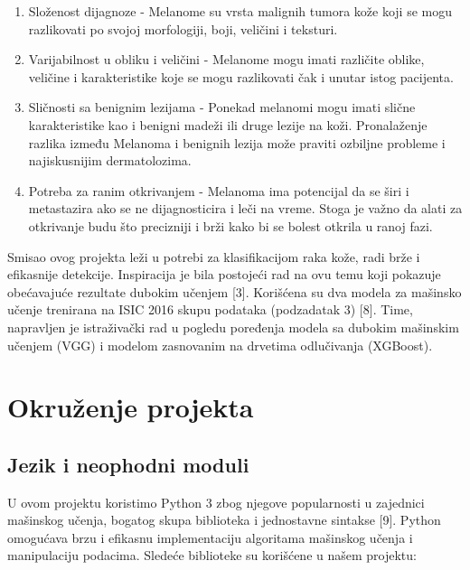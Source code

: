 \documentclass{article}
\begin{document}
\begin{enumerate}
    \item Složenost dijagnoze - Melanome su vrsta malignih tumora kože koji se mogu razlikovati po svojoj morfologiji, boji, veličini i teksturi.
    \item Varijabilnost u obliku i veličini - Melanome mogu imati različite oblike, veličine i karakteristike koje se mogu razlikovati čak i unutar istog pacijenta.
    \item Sličnosti sa benignim lezijama - Ponekad melanomi mogu imati slične karakteristike kao i benigni madeži ili druge lezije na koži. Pronalaženje razlika između Melanoma i benignih lezija može praviti ozbiljne probleme i najiskusnijim dermatolozima.
    \item Potreba za ranim otkrivanjem - Melanoma ima potencijal da se širi i metastazira ako se ne dijagnosticira i leči na vreme. Stoga je važno da alati za otkrivanje budu što precizniji i brži kako bi se bolest otkrila u ranoj fazi.
\end{enumerate}

\par
Smisao ovog projekta leži u potrebi za klasifikacijom raka kože, radi brže i efikasnije detekcije. Inspiracija je bila postojeći rad na ovu temu koji pokazuje obećavajuće rezultate dubokim učenjem [3]. Korišćena su dva modela za mašinsko učenje trenirana na ISIC 2016 skupu podataka (podzadatak 3) [8]. Time, napravljen je istraživački rad u pogledu poređenja modela sa dubokim mašinskim učenjem (VGG) i modelom zasnovanim na drvetima odlučivanja (XGBoost).  

\section{Okruženje projekta}

\subsection{Jezik i neophodni moduli}
U ovom projektu koristimo Python 3 zbog njegove popularnosti u zajednici mašinskog učenja, bogatog skupa biblioteka i jednostavne sintakse [9]. Python omogućava brzu i efikasnu implementaciju algoritama mašinskog učenja i manipulaciju podacima. Sledeće biblioteke su korišćene u našem projektu:
\end{document}
